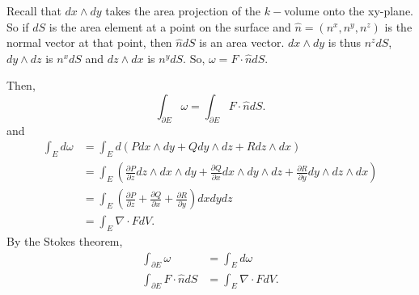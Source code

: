 \documentclass{article}
\begin{document}
Recall that $dx \wedge dy$ takes the area projection of the $k-$volume onto the xy-plane. So if $dS$ is the area element at a point on the surface and $\hat{n} = (n^x, n^y, n^z)$ is the normal vector at that point, then $\hat{n} dS$ is an area vector. $dx \wedge dy$  is thus $n^z dS$, $dy \wedge dz$ is $n^x dS$ and $dz \wedge dx$ is $n^y dS$. So, $\omega = F\cdot \hat{n} dS$.

Then,
\[
    \int_{\partial E} \omega = \int_{\partial E} F\cdot \hat{n} dS.
\]  
and
\begin{align*}
    \int_{E} d\omega &= \int_{E} d(P dx \wedge dy + Q dy \wedge dz + R dz \wedge dx) \\
    &= \int_{E} \left( \frac{\partial P}{\partial z} dz \wedge dx \wedge dy + \frac{\partial Q}{\partial x} dx \wedge dy \wedge dz + \frac{\partial R}{\partial y} dy \wedge dz \wedge dx \right) \\
    &= \int_{E} \left( \frac{\partial P}{\partial z} + \frac{\partial Q}{\partial x} + \frac{\partial R}{\partial y} \right) dxdydz \\
    &= \int_{E} \nabla \cdot F dV.
\end{align*}
By the Stokes theorem,
\begin{align*}
    \int_{\partial E} \omega &= \int_{E} d\omega \\
    \int_{\partial E} F\cdot \hat{n} dS &= \int_{E} \nabla \cdot F dV.
\end{align*}
\end{document}
